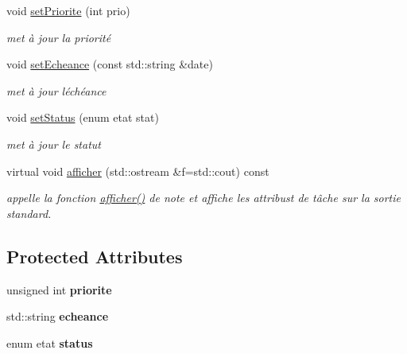\begin{DoxyCompactItemize}
void \hyperlink{classtache_a35292bd0bec7a172bf3c70ca3a441153}{set\+Priorite} (int prio)
\begin{DoxyCompactList}\small\item\em met à jour la priorité \end{DoxyCompactList}\item 
void \hyperlink{classtache_adaea7e42b4e6fc8f8903152300968e26}{set\+Echeance} (const std\+::string \&date)
\begin{DoxyCompactList}\small\item\em met à jour l\textquotesingle{}échéance \end{DoxyCompactList}\item 
void \hyperlink{classtache_afd4cda07440e36dc0f47079b110d022e}{set\+Status} (enum etat stat)
\begin{DoxyCompactList}\small\item\em met à jour le statut \end{DoxyCompactList}\item 
\mbox{\label{classtache_af319d97c3f228649dce7c24da39307aa}} 
virtual void \hyperlink{classtache_af319d97c3f228649dce7c24da39307aa}{afficher} (std\+::ostream \&f=std\+::cout) const
\begin{DoxyCompactList}\small\item\em appelle la fonction \hyperlink{classtache_af319d97c3f228649dce7c24da39307aa}{afficher()} de note et affiche les attribust de tâche sur la sortie standard. \end{DoxyCompactList}\end{DoxyCompactItemize}
\subsection*{Protected Attributes}
\begin{DoxyCompactItemize}
\item 
\mbox{\label{classtache_a50a5f64a76ff14f1467e2b0080618ab9}} 
unsigned int {\bfseries priorite}
\item 
\mbox{\label{classtache_ac49ccbd0d4cd98706d0f45feb4ebe60f}} 
std\+::string {\bfseries echeance}
\item 
\mbox{\label{classtache_acb16537d9ba98cde8d2abc3ac03acf77}} 
enum etat {\bfseries status}
\end{DoxyCompactItemize}



